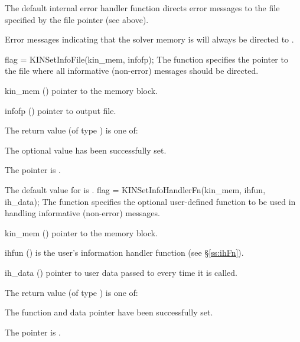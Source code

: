 {
  The default internal error handler function directs error messages to the
  file specified by the file pointer  (see  above).

  Error messages indicating that the {\kinsol} solver memory is  will
  always be directed to .
}
{
flag = KINSetInfoFile(kin\_mem, infofp);
}
{
  The function  specifies the pointer to the file
  where all informative (non-error) messages should be directed.
}
{
  \begin{args}
  \item[kin\_mem] ()
    pointer to the {\kinsol} memory block.
  \item[infofp] ()
    pointer to output file.
  \end{args}
}
{
  The return value  (of type ) is one of:
  \begin{args}
  \item[\Id{KIN\_SUCCESS}] 
    The optional value has been successfully set.
  \item[\Id{KIN\_MEM\_NULL}]
    The  pointer is .
  \end{args}
}
{
  The default value for  is .
}
{
flag = KINSetInfoHandlerFn(kin\_mem, ihfun, ih\_data);
}
{
  The function  specifies the optional user-defined function
  to be used in handling informative (non-error) messages.
}
{
  \begin{args}
  \item[kin\_mem] ()
    pointer to the {\kinsol} memory block.
  \item[ihfun] ()
    is the user's {\C} information handler function (see \S\ref{ss:ihFn}).
  \item[ih\_data] ()
    pointer to user data passed to  every time it is called.
  \end{args}
}
{
  The return value  (of type ) is one of:
  \begin{args}
  \item[\Id{KIN\_SUCCESS}] 
    The function  and data pointer  have been successfully set.
  \item[\Id{KIN\_MEM\_NULL}]
    The  pointer is .
  \end{args}
}
